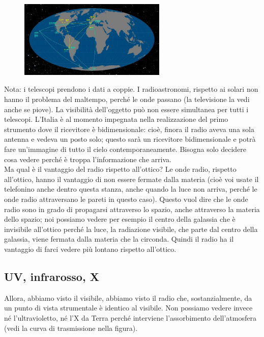 \documentclass[a4paper,11pt]{article}
\begin{document}
\begin{figure}[h!!]
        \centering
        \includegraphics[width=7cm]{34.jpg}
        \label{}
    \end{figure}

Nota: i telescopi prendono i dati a coppie. 
I radioastronomi, rispetto ai solari non hanno il problema del maltempo, perché le onde passano (la televisione la vedi anche se piove). La visibilità dell’oggetto può non essere simultanea per tutti i telescopi. L’Italia è al momento impegnata nella realizzazione del primo strumento dove il ricevitore è bidimensionale: cioè, finora il radio aveva una sola antenna e vedeva un posto solo; questo sarà un ricevitore bidimensionale e potrà fare un’immagine di tutto il cielo contemporaneamente. Bisogna solo decidere cosa vedere perché è troppa l’informazione che arriva.\\

Ma qual è il vantaggio del radio rispetto all’ottico? Le onde radio, rispetto all’ottico, hanno il vantaggio di non essere fermate dalla materia (cioè voi usate il telefonino anche dentro questa stanza, anche quando la luce non arriva, perché le onde radio attraversano le pareti in questo caso). Questo vuol dire che le onde radio sono in grado di propagarsi attraverso lo spazio, anche attraverso la materia dello spazio; noi possiamo vedere per esempio il centro della galassia che è invisibile all’ottico perché la luce, la radiazione visibile, che parte dal centro della galassia, viene fermata dalla materia che la circonda. Quindi il radio ha il vantaggio di farci vedere più lontano rispetto all’ottico.

\subsection{UV, infrarosso, X}

Allora, abbiamo visto il visibile, abbiamo visto il radio che, sostanzialmente, da un punto di vista strumentale è identico al visibile. Non possiamo vedere invece né l’ultravioletto, né l’X da Terra perché interviene l’assorbimento dell’atmosfera (vedi la curva di trasmissione nella figura).
\end{document}
